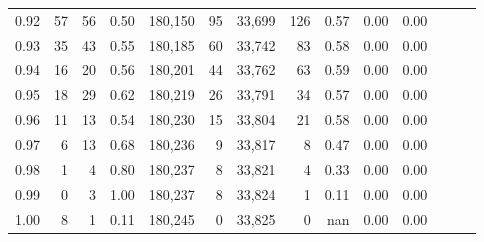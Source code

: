 \begin{tabular}{rrrrrrrrrrrrrr}
0.92 &     57 &     56 &  0.50 &  180,150 &       95 &  33,699 &     126 &  0.57 &  0.00 &      0.00 \\
0.93 &     35 &     43 &  0.55 &  180,185 &       60 &  33,742 &      83 &  0.58 &  0.00 &      0.00 \\
0.94 &     16 &     20 &  0.56 &  180,201 &       44 &  33,762 &      63 &  0.59 &  0.00 &      0.00 \\
0.95 &     18 &     29 &  0.62 &  180,219 &       26 &  33,791 &      34 &  0.57 &  0.00 &      0.00 \\
0.96 &     11 &     13 &  0.54 &  180,230 &       15 &  33,804 &      21 &  0.58 &  0.00 &      0.00 \\
0.97 &      6 &     13 &  0.68 &  180,236 &        9 &  33,817 &       8 &  0.47 &  0.00 &      0.00 \\
0.98 &      1 &      4 &  0.80 &  180,237 &        8 &  33,821 &       4 &  0.33 &  0.00 &      0.00 \\
0.99 &      0 &      3 &  1.00 &  180,237 &        8 &  33,824 &       1 &  0.11 &  0.00 &      0.00 \\
1.00 &      8 &      1 &  0.11 &  180,245 &        0 &  33,825 &       0 &   nan &  0.00 &      0.00 \\
\bottomrule
\end{tabular}

